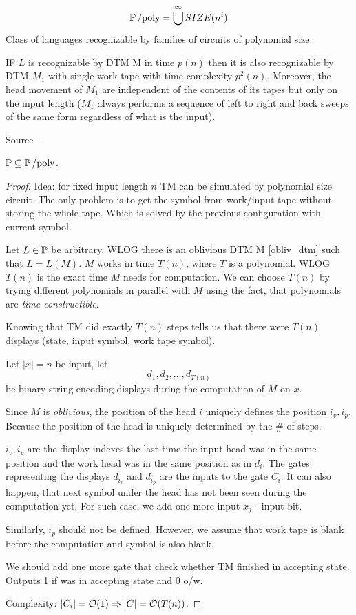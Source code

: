 \begin{definition}
	\[ \operatorname{\operatorname{\mathbb{P}}/poly} = \bigcup^{\infty} SIZE (n^i) \]
	Class of languages recognizable by families of circuits of polynomial size.
\end{definition}

\begin{definition}\label{obliv_dtm}
	IF $L$ is recognizable by DTM M in time $p(n)$ then it is also recognizable by DTM $M_1$ with single work tape with time complexity $p^2(n)$.
	Moreover, the head movement of $M_1$ are independent of the contents of its tapes but only on the input length ($M_1$ always performs a sequence of left to right and back sweeps of the same form regardless of what is the input).

	Source ~\cite[p. 37]{arora2009computational}.
\end{definition}

\begin{theorem}[$\TP \subseteq \Ppoly$]\label{tp_ppoly}
	$\TP \subseteq \Ppoly$.
\end{theorem}
\begin{proof}
	Idea: for fixed input length $n$ TM can be simulated by polynomial size circuit.
	The only problem is to get the symbol from work/input tape without storing the whole tape.
	Which is solved by the previous configuration with current symbol.

	Let $L \in \operatorname{\mathbb{P}}$ be arbitrary. WLOG there is an oblivious DTM M \cref{obliv_dtm} such that $L = L(M)$.
	$M$ works in time $T(n)$, where $T$ is a polynomial.
	WLOG $T(n)$ is the exact time $M$ needs for computation.
	We can choose $T(n)$ by trying different polynomials in parallel with $M$ using the fact, that polynomials are \emph{time constructible}.

	Knowing that TM did exactly $T(n)$ steps tells us that there were $T(n)$ displays (state, input symbol, work tape symbol).

	Let $|x| = n$ be input, let
	\[ d_1, d_2, \ldots, d_{T(n)} \]
	be binary string encoding displays during the computation of $M$ on $x$.

	Since $M$ is \emph{oblivious}, the position of the head $i$ uniquely defines the position $i_v, i_p$.
	Because the position of the head is uniquely determined by the \# of steps.

	$i_v, i_p$ are the display indexes the last time the input head was in the same position and the work head was in the same position as in $d_i$.
	The gates representing the displays $d_{i_v}$ and $d_{i_p}$ are the inputs to the gate $C_i$.
	It can also happen, that next symbol under the head has not been seen during the computation yet.
	For such case, we add one more input $x_j$ - input bit.

	Similarly, $i_p$ should not be defined.
	However, we assume that work tape is blank before the computation and symbol is also blank.

	We should add one more gate that check whether TM finished in accepting state.
	Outputs 1 if was in accepting state and 0 o/w.

	Complexity: $|C_i| = \mathcal{O}(1) \Rightarrow |C| = \mathcal{O}(T(n))$.
\end{proof}

